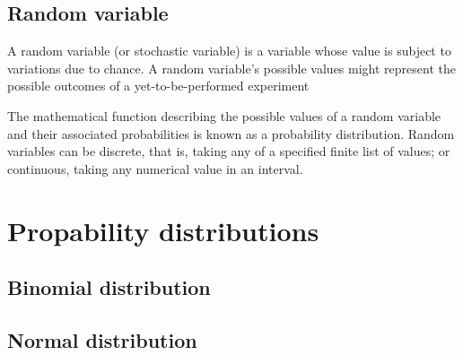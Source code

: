 \subsection{Random variable}
A random variable (or stochastic variable) is a variable whose value is subject to variations due to chance. A random variable's possible values might represent the possible outcomes of a yet-to-be-performed experiment

The mathematical function describing the possible values of a random variable and their associated probabilities is known as a probability distribution. Random variables can be discrete, that is, taking any of a specified finite list of values; or continuous, taking any numerical value in an interval.

\section{Propability distributions}
\subsection{Binomial distribution}
\subsection{Normal distribution}

